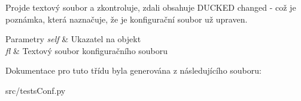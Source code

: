 Projde textový soubor a zkontroluje, zdali obsahuje D\-U\-C\-K\-E\-D changed -\/ což je poznámka, která naznačuje, že je konfigurační soubor už upraven. 


\begin{DoxyParams}{Parametry}
{\em self} & Ukazatel na objekt \\
\hline
{\em fl} & Textový soubor konfiguračního souboru \\
\hline
\end{DoxyParams}


Dokumentace pro tuto třídu byla generována z následujícího souboru\-:\begin{DoxyCompactItemize}
\item 
src/tests\-Conf.\-py\end{DoxyCompactItemize}
